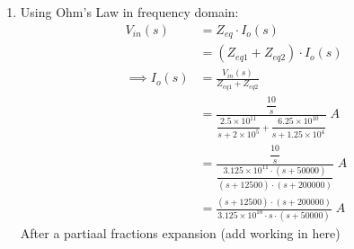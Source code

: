 \begin{enumerate}
{\begin{align*}
{		{s+1.25 \times 10^4}}{\dfrac{(6.25 \times 10^{10})					%
		(s + 2\times 10^5) + (2.5 \times 10^{11})(s + 1.25 \times 10^4)}	%
		{(s + 1.25 \times 10^4)\cdot(s + 2 \times 10^5)}} \; V\\
		&= \frac{10}{s} \cdot \frac{6.25 \times 10^{10}}            
		{s+1.25 \times 10^4} \cdot \frac{(s + 1.25 \times 10^4)
		\cdot(s + 2 \times 10^5)}{(6.25 \times 10^{10})
		(s + 2\times 10^5) + (2.5 \times 10^{11})
		(s + 1.25 \times 10^4)} \; V\\
		&= \frac{6.25 \times 10^{11} \cdot (s + 1.25 \times 10^4) \cdot 
		(s + 2 \times 10^5)}{3.125 \times 10^{11} \cdot s \cdot 
		(s + 1.25 \times 10^4) \cdot (s + 5 \times 10^4)} \; V\\
		&= \frac{2 \cdot (s + 2 \times 10^5)}
		{s \cdot (s + 5 \times 10^4)} \; V\\
		&= \frac{2s + 4 \times 10^5}{s^2 + 5 \times 10^4 \cdot s} \; V\\
		\end{align*}
		Using Partial fractions to continue.
		\begin{align*}
		\frac{2s + 4 \times 10^5}{s^2 + 5 \times 10^4 \cdot s} &= 
		\frac{A}{s} + \frac{B}{50000}\\
		A(s+50000) + Bs &= 2(s + 200000)\\
		(s = 0): \; 50000A &= 400000\\
		\implies A &= 8\\
		(s = -50000): \;  -50000B &= 300000\\
		B &= -6\\
		\implies V_o(s) = \frac{8}{s} - \frac{6}{s + 50000} \; V
		\end{align*}
		Using inverse Laplace transform to find $v_o(t)$.
		\begin{align*}
		v_o(t) &= \mathcal{L}^{-1} [V_o(s)]\\
		&= \mathcal{L}^{-1} \left[\frac{8}{s} - \frac{6}{s + 50000}\right]\; V\\
		&= (8 -6 e^{-50000t})u(t)\;V
		\end{align*}
	}
	\item{
		Using Ohm's Law in frequency domain:
		\begin{align*}
		V_{in}(s) &= Z_{eq} \cdot I_o(s)\\
		&= (Z_{eq1} + Z_{eq2}) \cdot I_o(s)\\
		\implies I_o(s) &= \frac{V_{in}(s)}{Z_{eq1} + Z_{eq2}}\\
		&= \frac{\dfrac{10}{s}} 
		{\dfrac{2.5 \times 10^{11}}
		{s + 2 \times 10^5} + \dfrac{6.25 \times 10^{10}}{s + 1.25 \times 10^4}} \; A\\
		&= \frac{\dfrac{10}{s}} 
		{\dfrac{3.125 \times 10^{11} \cdot (s + 50000)}{(s+12500)\cdot(s+200000)}} \; A\\
		&= \frac{(s+12500)\cdot(s+200000)}{3.125 \times 10^{10} \cdot s \cdot (s + 50000)} \; A
		\end{align*}
		After a partiaal fractions expansion (add working in here)
		
}
\end{enumerate}
